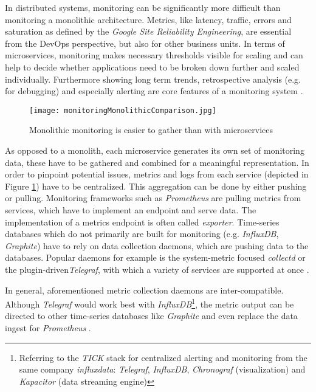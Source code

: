 
In distributed systems, monitoring can be significantly more difficult than monitoring a monolithic architecture.
Metrics, like latency, traffic, errors and saturation as defined by the \textit{Google Site Reliability Engineering}, are essential from the DevOps perspective, but also for other business units.
In terms of microservices, monitoring makes necessary thresholds visible for scaling and can help to decide whether applications need to be broken down further and scaled individually.
Furthermore showing long term trends, retrospective analysis (e.g. for debugging) and especially alerting are core features of a monitoring system \cite{Ewaschuk.02.12.2019}.

\begin{figure}
	\centering
	\texttt{[image: monitoringMonolithicComparison.jpg]}
	\caption{Monolithic monitoring is easier to gather than with microservices~\cite{Fichtner.2016}}
	\label{img:monitoringMonolithicComparison}
\end{figure}

As opposed to a monolith, each microservice generates its own set of monitoring data, these have to be gathered and combined for a meaningful representation.
In order to pinpoint potential issues, metrics and logs from each service (depicted in Figure \ref{img:monitoringMonolithicComparison}) have to be centralized.
This aggregation can be done by either pushing or pulling.
Monitoring frameworks such as \textit{Prometheus} are pulling metrics from services, which have to implement an endpoint and serve data.
The implementation of a metrics endpoint is often called \textit{exporter}.
Time-series databases which do not primarily are built for monitoring (e.g. \textit{InfluxDB}, \textit{Graphite}) have to rely on data collection daemons, which are pushing data to the databases.
Popular daemons for example is the system-metric focused \textit{collectd} or the plugin-driven\textit{Telegraf}, with which a variety of services are supported at once \cite{Fichtner.2016}\cite{Richardson.20.05.2020}\cite{Ewaschuk.02.12.2019}.

In general, aforementioned metric collection daemons are inter-compatible.
Although \textit{Telegraf} would work best with \textit{InfluxDB}\footnote{Referring to the \textit{TICK} stack for centralized alerting and monitoring from the same company \textit{influxdata}: \textit{Telegraf}, \textit{InfluxDB}, \textit{Chronograf} (visualization) and \textit{Kapacitor} (data streaming engine)}, the metric output can be directed to other time-series databases like \textit{Graphite} and even replace the data ingest for \textit{Prometheus} \cite{Loschwitz.2018}.

